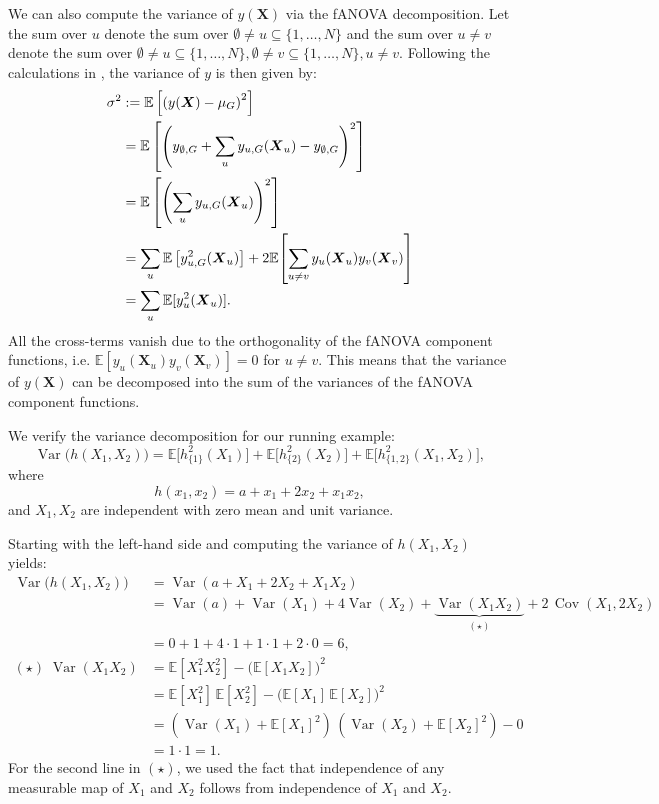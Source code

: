 We can also compute the variance of $y(\boldsymbol{X})$ via the fANOVA decomposition.
Let the sum over $u$ denote the sum over $\emptyset \neq u \subseteq \{1, \dots, N\}$ and the sum over $u \neq v$ denote the sum over $\emptyset \neq u \subseteq \{1, \dots, N\}, \emptyset \neq v \subseteq \{1, \dots, N\}, u \neq v$.
Following the calculations in \cite{rahman2014}, the variance of $y$ is then given by:
\begin{align}\label{eq:variance_decomposition_classical}
\sigma^2 
&:= \mathbb{E}\left[ \left( y(\boldsymbol{X}) - \mu_G \right)^2 \right] \notag \\
&= \mathbb{E} \left[ \left( y_{\emptyset,G} + \sum_{u} y_{u,G}(\boldsymbol{X}_u) - y_{\emptyset,G} \right)^2 \right] \notag \\
&= \mathbb{E} \left[ \left( \sum_{u} y_{u,G}(\boldsymbol{X}_u) \right)^2 \right] \notag \\
&= \sum_{u} \mathbb{E} \left[ y_{u,G}^2(\boldsymbol{X}_u) \right]
 + 2 \mathbb{E}\!\left[\sum_{u \neq v} y_u({\boldsymbol{X}_u}) y_v({\boldsymbol{X}_v})\right] \notag \\ 
& = \sum_{u} \mathbb{E}[y_u^2({\boldsymbol{X}_u})].
\end{align}
All the cross-terms vanish due to the orthogonality of the fANOVA component functions, i.e. $\mathbb{E}[y_u({\boldsymbol{X}_u})  y_v({\boldsymbol{X}_v})] = 0$ for $u \neq v$.
This means that the variance of $y(\boldsymbol{X})$ can be decomposed into the sum of the variances of the fANOVA component functions.

We verify the variance decomposition for our running example:
\[
  \operatorname{Var}\big(h(X_1,X_2)\big)
  = \mathbb{E}\!\big[h_{\{1\}}^2(X_1)\big]
  + \mathbb{E}\!\big[h_{\{2\}}^2(X_2)\big]
  + \mathbb{E}\!\big[h_{\{1,2\}}^2(X_1,X_2)\big],
\]
where 
\[
  h(x_1,x_2) = a + x_1 + 2x_2 + x_1x_2,
\]
and $X_1,X_2$ are independent with zero mean and unit variance.

Starting with the left-hand side and computing the variance of $h(X_1,X_2)$ yields:
\begin{align*}
\operatorname{Var}\big(h(X_1,X_2)\big)
&= \operatorname{Var}(a + X_1 + 2X_2 + X_1X_2) \\
&= \operatorname{Var}(a) + \operatorname{Var}(X_1) + 4\operatorname{Var}(X_2)
   + \underbrace{\operatorname{Var}(X_1X_2)}_{(\star)}
   + 2\,\operatorname{Cov}(X_1,2X_2) \\
&= 0 + 1 + 4 \cdot 1 + 1 \cdot 1 + 2\cdot 0 = 6, \\[0.3em]
(\star)\;\operatorname{Var}(X_1X_2)
&= \mathbb{E}[X_1^2 X_2^2] - \big(\mathbb{E}[X_1 X_2]\big)^2 \\
&=\mathbb{E}[X_1^2]\,\mathbb{E}[X_2^2]
   - \big(\mathbb{E}[X_1]\,\mathbb{E}[X_2]\big)^2 \\
&= (\operatorname{Var}(X_1)+\mathbb{E}[X_1]^2)\,
   (\operatorname{Var}(X_2)+\mathbb{E}[X_2]^2) - 0 \\
&= 1\cdot 1 = 1.
\end{align*}
For the second line in $(\star)$, we used the fact that independence of any measurable map of $X_1$ and $X_2$ follows from independence of $X_1$ and $X_2$.

